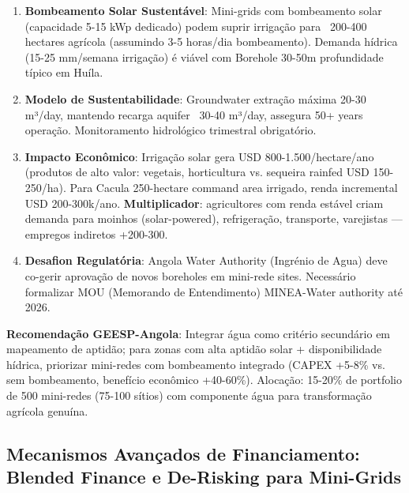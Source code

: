 \documentclass[12pt, a4paper]{article}
\begin{document}
\begin{enumerate}
\item\textbf{Bombeamento Solar Sustentável}: Mini-grids com bombeamento solar (capacidade 5-15 kWp dedicado) podem suprir irrigação para ~200-400 hectares agrícola (assumindo 3-5 horas/dia bombeamento). Demanda hídrica (15-25 mm/semana irrigação) é viável com Borehole 30-50m profundidade típico em Huíla.
\item\textbf{Modelo de Sustentabilidade}: Groundwater extração máxima 20-30 m³/day, mantendo recarga aquifer ~30-40 m³/day, assegura 50+ years operação. Monitoramento hidrológico trimestral obrigatório.
\item
\textbf{Impacto Econômico}: Irrigação solar gera USD 800-1.500/hectare/ano (produtos de alto valor: vegetais, horticultura vs. sequeira rainfed USD 150-250/ha). Para Cacula 250-hectare command area irrigado, renda incremental USD 200-300k/ano.
\textbf{Multiplicador}: agricultores com renda estável criam demanda para moinhos (solar-powered), refrigeração, transporte, varejistas — empregos indiretos +200-300.
\item\textbf{Desafion Regulatória}: Angola Water Authority (Ingrénio de Agua) deve co-gerir aprovação de novos boreholes em mini-rede sites. Necessário formalizar MOU (Memorando de Entendimento) MINEA-Water authority até 2026.
\end{enumerate}\textbf{Recomendação GEESP-Angola}: Integrar água como critério secundário em mapeamento de aptidão; para zonas com alta aptidão solar + disponibilidade hídrica, priorizar mini-redes com bombeamento integrado (CAPEX +5-8\% vs. sem bombeamento, benefício econômico +40-60\%). Alocação: 15-20\% de portfolio de 500 mini-redes (75-100 sítios) com componente água para transformação agrícola genuína.

\subsection{Mecanismos Avançados de Financiamento: Blended Finance e De-Risking para Mini-Grids}
\end{document}
